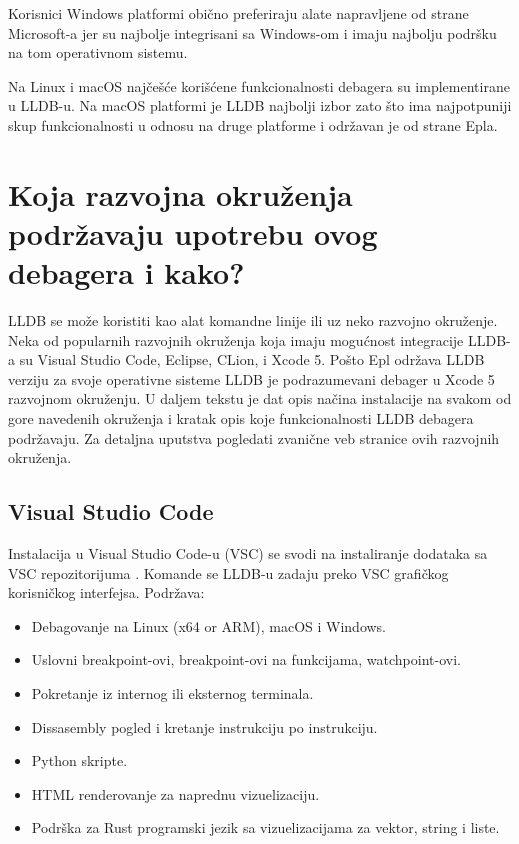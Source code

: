 \documentclass[a4paper]{article}
\begin{document}
Korisnici Windows platformi obično preferiraju alate napravljene od strane Microsoft-a jer su najbolje integrisani sa Windows-om i imaju najbolju podršku na tom operativnom sistemu.

Na Linux i macOS najčešće korišćene funkcionalnosti debagera su implementirane u LLDB-u. Na macOS platformi je LLDB najbolji izbor zato što ima najpotpuniji skup funkcionalnosti u odnosu na druge platforme i održavan je od strane Epla.

\section{Koja razvojna okruženja podržavaju upotrebu ovog debagera i kako?}
\label{sec:Koja razvojna okruzenja podrzavaju upotrebu ovog debagera i kako?}

LLDB se može koristiti kao alat komandne linije ili uz neko razvojno okruženje. Neka od popularnih razvojnih okruženja koja imaju mogućnost integracije LLDB-a su Visual Studio Code, Eclipse, CLion, i Xcode 5. Pošto Epl održava LLDB verziju za svoje operativne sisteme LLDB je podrazumevani debager u Xcode 5 razvojnom okruženju. 
U daljem tekstu je dat opis načina instalacije na svakom od gore navedenih okruženja i kratak opis koje funkcionalnosti LLDB debagera podržavaju. Za detaljna uputstva pogledati zvanične veb stranice ovih razvojnih okruženja.

\subsection*{Visual Studio Code}
Instalacija u Visual Studio Code-u (VSC) se svodi na instaliranje dodataka sa VSC repozitorijuma \cite{visual_code_plugin}. Komande se LLDB-u zadaju preko VSC grafičkog korisničkog interfejsa. 
Podržava:
\begin{itemize}
\item Debagovanje na Linux (x64 or ARM), macOS i Windows.
\item Uslovni breakpoint-ovi, breakpoint-ovi na funkcijama, watchpoint-ovi.
\item Pokretanje iz internog ili eksternog terminala.
\item Dissasembly pogled i kretanje instrukciju po instrukciju.
\item Python skripte.
\item HTML renderovanje za naprednu vizuelizaciju.
\item Podrška za Rust programski jezik sa vizuelizacijama za vektor, string i liste.
\end{itemize}
\end{document}
